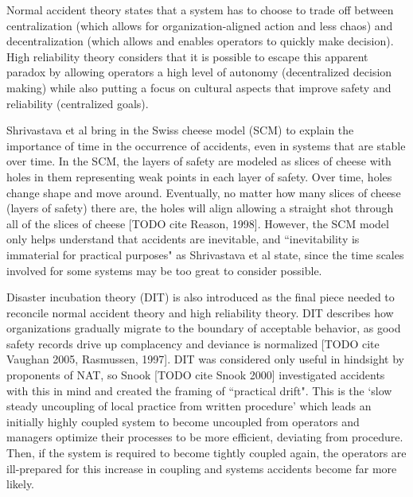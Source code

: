 \documentclass[11pt]{article}
\begin{document}
Normal accident theory states that a system has to choose to trade off between centralization (which
allows for organization-aligned action and less chaos) and decentralization (which allows and
enables operators to quickly make decision). High reliability theory considers that it is possible
to escape this apparent paradox by allowing operators a high level of autonomy (decentralized
decision making) while also putting a focus on cultural aspects that improve safety and reliability
(centralized goals).

Shrivastava et al bring in the Swiss cheese model (SCM) to explain the importance of time in the
occurrence of accidents, even in systems that are stable over time. In the SCM, the layers of safety
are modeled as slices of cheese with holes in them representing weak points in each layer of safety.
Over time, holes change shape and move around. Eventually, no matter how many slices of cheese
(layers of safety) there are, the holes will align allowing a straight shot through all of the
slices of cheese [TODO cite Reason, 1998]. However, the SCM model only helps understand that
accidents are inevitable, and ``inevitability is immaterial for practical purposes" as Shrivastava
et al state, since the time scales involved for some systems may be too great to consider possible.

Disaster incubation theory (DIT) is also introduced as the final piece needed to reconcile normal
accident theory and high reliability theory. DIT describes how organizations gradually migrate to
the boundary of acceptable behavior, as good safety records drive up complacency and deviance is
normalized [TODO cite Vaughan 2005, Rasmussen, 1997]. DIT was considered only useful in hindsight by
proponents of NAT, so Snook [TODO cite Snook 2000] investigated accidents with this in mind and
created the framing of ``practical drift". This is the `slow steady uncoupling of local practice
from written procedure' which leads an initially highly coupled system to become uncoupled from
operators and managers optimize their processes to be more efficient, deviating from procedure.
Then, if the system is required to become tightly coupled again, the operators are ill-prepared for
this increase in coupling and systems accidents become far more likely.
\end{document}
